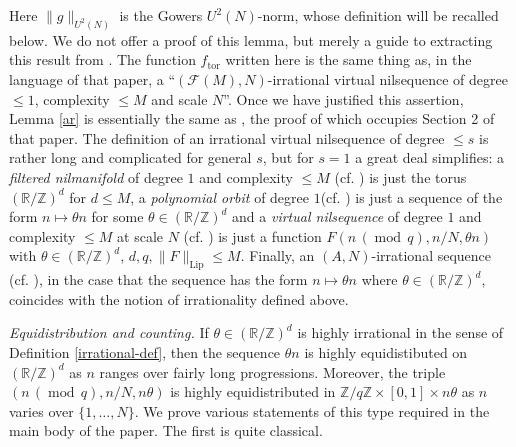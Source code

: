\documentclass[10pt,reqno]{amsart}
\theoremstyle{definition}
\theoremstyle{remark}
\newcommand{\md}[1]{\ensuremath{\,(\operatorname{mod}\, #1)}}
\renewcommand{\leq}{\leqslant}
\newcommand\Lip{\operatorname{Lip}}
\newcommand\tor{\operatorname{tor}}
\def\R{\mathbb{R}}
\def\Z{\mathbb{Z}}
\numberwithin{equation}{section}
\begin{document}
Here $\| g \|_{U^2(N)}$ is the Gowers $U^2(N)$-norm, whose definition will be recalled below. We do not offer a proof of this lemma, but merely a guide to extracting this result from \cite{green-tao-arithregularity}. The function $f_{\tor}$ written here is the same thing as, in the language of that paper, a ``$(\mathcal{F}(M), N)$-irrational virtual nilsequence of degree $\leq 1$, complexity $\leq M$ and scale $N$''. Once we have justified this assertion, Lemma \ref{ar} is essentially the same as \cite[Theorem 1.2]{green-tao-arithregularity}, the proof of which occupies Section 2 of that paper. The definition of an irrational virtual nilsequence of degree $\leq s$ is rather long and complicated for general $s$, but for $s = 1$ a great deal simplifies: a \emph{filtered nilmanifold} of degree $1$ and complexity $\leq M$ (cf. \cite[Definition 1.4]{green-tao-arithregularity}) is just the torus $(\R/\Z)^d$ for $d \leq M$, a \emph{polynomial orbit} of degree $1$(cf. \cite[Definition 1.7]{green-tao-arithregularity}) is just a sequence of the form $n \mapsto \theta n$ for some $\theta \in (\R/\Z)^d$ and a \emph{virtual nilsequence} of degree $1$ and complexity $\leq M$ at scale $N$ (cf. \cite[Definition 1.9]{green-tao-arithregularity}) is just a function $F(n \md{q}, n/N, \theta n)$ with $\theta \in (\R/\Z)^d$, $d,q,\|F\|_{\Lip} \leq M$. Finally, an $(A,N)$-irrational sequence (cf. \cite[Definition A.6]{green-tao-arithregularity}), in the case that the sequence has the form $n\mapsto\theta n$ where $\theta \in (\R/\Z)^d$, coincides with the notion of irrationality defined above.

\emph{Equidistribution and counting.} If $\theta \in (\R/\Z)^d$ is highly irrational in the sense of Definition \ref{irrational-def}, then the sequence $\theta n$ is highly equidistibuted on $(\R/\Z)^d$ as $n$ ranges over fairly long progressions. Moreover, the triple $(n \md{q}, n/N, n\theta)$ is highly equidistributed in $\Z/q\Z \times [0,1] \times n\theta$ as $n$ varies over $\{1,\dots,N\}$. We prove various statements of this type required in the main body of the paper. The first is quite classical. 
\end{document}
